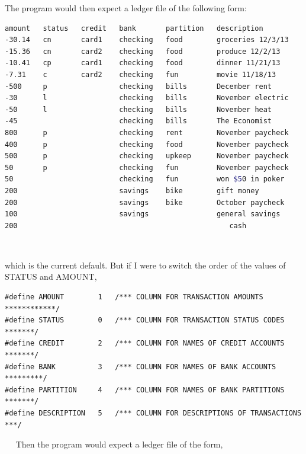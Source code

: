 \documentclass{article}
\providecommand{\q}{$\quad$ \newline}
\begin{document}
\begin{flushleft}
The program would then expect a ledger file of the following form: \q

\begin{lstlisting}[language=bash]
amount   status   credit   bank       partition   description
-30.14   cn       card1    checking   food        groceries 12/3/13
-15.36   cn       card2    checking   food        produce 12/2/13
-10.41   cp       card1    checking   food        dinner 11/21/13
-7.31    c        card2    checking   fun         movie 11/18/13
-500     p                 checking   bills       December rent
-30      l                 checking   bills       November electric
-50      l                 checking   bills       November heat
-45                        checking   bills       The Economist
800      p                 checking   rent        November paycheck		
400      p                 checking   food        November paycheck	
500      p                 checking   upkeep      November paycheck		
50       p                 checking   fun         November paycheck	
50                         checking   fun         won $50 in poker		
200                        savings    bike        gift money
200                        savings    bike        October paycheck
100                        savings                general savings
200                                                  cash
\end{lstlisting} \q

which is the current default. But if I were to switch the order of the values of STATUS and AMOUNT, 

\begin{lstlisting}
#define AMOUNT        1   /*** COLUMN FOR TRANSACTION AMOUNTS ************/
#define STATUS        0   /*** COLUMN FOR TRANSACTION STATUS CODES *******/
#define CREDIT        2   /*** COLUMN FOR NAMES OF CREDIT ACCOUNTS *******/
#define BANK          3   /*** COLUMN FOR NAMES OF BANK ACCOUNTS *********/       
#define PARTITION     4   /*** COLUMN FOR NAMES OF BANK PARTITIONS *******/
#define DESCRIPTION   5   /*** COLUMN FOR DESCRIPTIONS OF TRANSACTIONS ***/
\end{lstlisting} 

\q 
Then the program would expect a ledger file of the form,\q


\end{flushleft}
\end{document}
